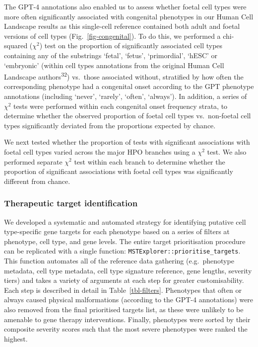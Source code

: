 \documentclass[
]{agujournal2019}
\begin{document}
The GPT-4 annotations also enabled us to assess whether foetal cell
types were more often significantly associated with congenital
phenotypes in our Human Cell Landscape results as this single-cell
reference contained both adult and foetal versions of cell types
(Fig.~\ref{fig-congenital}). To do this, we performed a chi-squared
(\(\chi^2\)) test on the proportion of significantly associated cell
types containing any of the substrings `fetal', `fetus', `primordial',
`hESC' or `embryonic' (within cell types annotations from the original
Human Cell Landscape authors\textsuperscript{32}) vs.~those associated
without, stratified by how often the corresponding phenotype had a
congenital onset according to the GPT phenotype annotations (including
`never', `rarely', `often', `always'). In addition, a series of
\(\chi^2\) tests were performed within each congenital onset frequency
strata, to determine whether the observed proportion of foetal cell
types vs.~non-foetal cell types significantly deviated from the
proportions expected by chance.

We next tested whether the proportion of tests with significant
associations with foetal cell types varied across the major HPO branches
using a \(\chi^2\) test. We also performed separate \(\chi^2\) test
within each branch to determine whether the proportion of significant
associations with foetal cell types was significantly different from
chance.

\subsubsection{Therapeutic target
identification}\label{therapeutic-target-identification-1}

We developed a systematic and automated strategy for identifying
putative cell type-specific gene targets for each phenotype based on a
series of filters at phenotype, cell type, and gene levels. The entire
target prioritisation procedure can be replicated with a single
function: \texttt{MSTExplorer::prioritise\_targets}. This function
automates all of the reference data gathering (e.g.~phenotype metadata,
cell type metadata, cell type signature reference, gene lengths,
severity tiers) and takes a variety of arguments at each step for
greater customisability. Each step is described in detail in
Table~\ref{tbl-filters}. Phenotypes that often or always caused physical
malformations (according to the GPT-4 annotations) were also removed
from the final prioritised targets list, as these were unlikely to be
amenable to gene therapy interventions. Finally, phenotypes were sorted
by their composite severity scores such that the most severe phenotypes
were ranked the highest.
\end{document}
